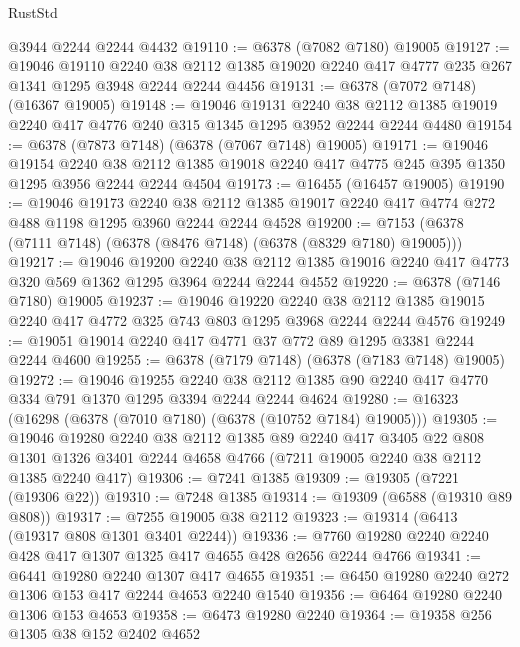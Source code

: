 \begin{lexlean}{RustStd}
\begin{coremodule}
    @3944
    @2244
    @2244
    @4432
@19110 := @6378 (@7082 @7180) @19005
@19127 := @19046
    @19110
    @2240
    @38
    @2112
    @1385
    @19020
    @2240
    @417
    @4777
    @235
    @267
    @1341
    @1295
    @3948
    @2244
    @2244
    @4456
@19131 := @6378 (@7072 @7148) (@16367 @19005)
@19148 := @19046
    @19131
    @2240
    @38
    @2112
    @1385
    @19019
    @2240
    @417
    @4776
    @240
    @315
    @1345
    @1295
    @3952
    @2244
    @2244
    @4480
@19154 := @6378 (@7873 @7148) (@6378 (@7067 @7148) @19005)
@19171 := @19046
    @19154
    @2240
    @38
    @2112
    @1385
    @19018
    @2240
    @417
    @4775
    @245
    @395
    @1350
    @1295
    @3956
    @2244
    @2244
    @4504
@19173 := @16455 (@16457 @19005)
@19190 := @19046
    @19173
    @2240
    @38
    @2112
    @1385
    @19017
    @2240
    @417
    @4774
    @272
    @488
    @1198
    @1295
    @3960
    @2244
    @2244
    @4528
@19200 := @7153 (@6378 (@7111 @7148) (@6378 (@8476 @7148) (@6378 (@8329 @7180) @19005)))
@19217 := @19046
    @19200
    @2240
    @38
    @2112
    @1385
    @19016
    @2240
    @417
    @4773
    @320
    @569
    @1362
    @1295
    @3964
    @2244
    @2244
    @4552
@19220 := @6378 (@7146 @7180) @19005
@19237 := @19046
    @19220
    @2240
    @38
    @2112
    @1385
    @19015
    @2240
    @417
    @4772
    @325
    @743
    @803
    @1295
    @3968
    @2244
    @2244
    @4576
@19249 := @19051 @19014 @2240 @417 @4771 @37 @772 @89 @1295 @3381 @2244 @2244 @4600
@19255 := @6378 (@7179 @7148) (@6378 (@7183 @7148) @19005)
@19272 := @19046
    @19255
    @2240
    @38
    @2112
    @1385
    @90
    @2240
    @417
    @4770
    @334
    @791
    @1370
    @1295
    @3394
    @2244
    @2244
    @4624
@19280 := @16323 (@16298 (@6378 (@7010 @7180) (@6378 (@10752 @7184) @19005)))
@19305 := @19046
    @19280
    @2240
    @38
    @2112
    @1385
    @89
    @2240
    @417
    @3405
    @22
    @808
    @1301
    @1326
    @3401
    @2244
    @4658
    @4766
    (@7211 @19005 @2240 @38 @2112 @1385 @2240 @417)
@19306 := @7241 @1385
@19309 := @19305 (@7221 (@19306 @22))
@19310 := @7248 @1385
@19314 := @19309 (@6588 (@19310 @89 @808))
@19317 := @7255 @19005 @38 @2112
@19323 := @19314 (@6413 (@19317 @808 @1301 @3401 @2244))
@19336 := @7760 @19280 @2240 @2240 @428 @417 @1307 @1325 @417 @4655 @428 @2656 @2244 @4766
@19341 := @6441 @19280 @2240 @1307 @417 @4655
@19351 := @6450 @19280 @2240 @272 @1306 @153 @417 @2244 @4653 @2240 @1540
@19356 := @6464 @19280 @2240 @1306 @153 @4653
@19358 := @6473 @19280 @2240
@19364 := @19358 @256 @1305 @38 @152 @2402 @4652

\end{coremodule}
\end{lexlean}
